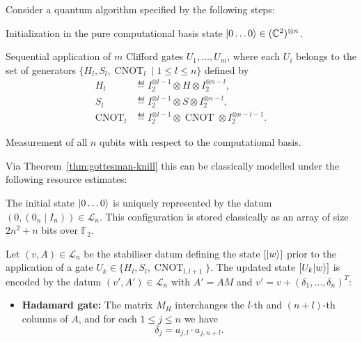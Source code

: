 \documentclass[a4paper, oneside, 12pt]{amsart}
\DeclareMathOperator{\CNOT}{CNOT}
\begin{document}
\begin{remark}\label{rmk:application-of-Gottesman--Knill-theorem}
  Consider a quantum algorithm specified by the following steps:
  \begin{thmlist}
    \item Initialization in the pure computational basis state \(\lvert0 \dots 0\rangle \in (\mathbb{C}^{2})^{\otimes n}\).
    \item Sequential application of \(m\) Clifford gates \(U_{1}, \dots , U_{m}\), where each \(U_{i}\) belongs to the set of generators \(\{H_l, S_l, \CNOT_{l} \mid 1 \leq l \leq n\}\) defined by
    \begin{align*}
      H_{l} &\eqdef I_{2}^{\otimes l-1} \otimes H \otimes I_{2}^{\otimes n - l}, \\
      S_{l} &\eqdef I_{2}^{\otimes l-1} \otimes S \otimes I_{2}^{\otimes n - l}, \\
      \CNOT_{l} &\eqdef I_{2}^{\otimes l-1} \otimes \CNOT \otimes I_{2}^{\otimes n - l - 1}.
    \end{align*}
    \item Measurement of all \(n\) qubits with respect to the computational basis.
  \end{thmlist}
  Via Theorem~\ref{thm:gottesman-knill} this can be classically modelled under the following resource estimates:
  \begin{thmlist}
    \item The initial state \(\lvert0 \dots 0\rangle\) is uniquely represented by the datum \((0, (0_n \mid I_n)) \in \mathcal{L}_n\).
    This configuration is stored classically as an array of size \(2n^2 + n\) bits over \(\mathbb{F}_2\).

    \item Let \((v,A) \in \mathcal{L}_n\) be the stabiliser datum defining the state \([\lvert w\rangle]\) prior to the application of a gate \(U_k \in \{H_l, S_l, \CNOT_{l,l+1}\}\).
    The updated state \([U_k \lvert w\rangle]\) is encoded by the datum \((v', A') \in \mathcal{L}_{n}\) with
    \(A' = AM\) and \( v' = v + (\delta_{1}, \dots , \delta_{n})^{T}\):
    \begin{itemize}
      \item \textbf{Hadamard gate:}
      The matrix \(M_H\) interchanges the \(l\)-th and \((n+l)\)-th columns of \(A\), and for each \(1\leq j \leq n\) we have
      \begin{equation*}
        \delta_j = a_{j,l}  \cdot a_{j,n+l}.
      \end{equation*}


\end{itemize}
\end{thmlist}
\end{remark}
\end{document}
